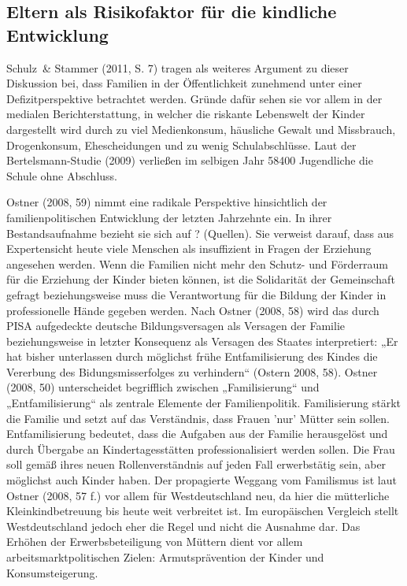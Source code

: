 \subsection{Eltern als Risikofaktor für die kindliche Entwicklung}\label{sec:Risikofaktoren}
Schulz~\& Stammer (2011, S. 7) tragen als weiteres Argument zu dieser Diskussion bei, dass Familien in der Öffentlichkeit zunehmend unter einer Defizitperspektive betrachtet werden. Gründe dafür sehen sie vor allem in der medialen Berichterstattung, in welcher die riskante Lebenswelt der Kinder dargestellt wird durch zu viel Medienkonsum, häusliche Gewalt und Missbrauch, Drogenkonsum, Ehescheidungen und zu wenig Schulabschlüsse. Laut der Bertelsmann-Studie (2009) verließen im selbigen Jahr 58400 Jugendliche die Schule ohne Abschluss. 

Ostner (2008, 59) nimmt eine radikale Perspektive hinsichtlich der familienpolitischen Entwicklung der letzten Jahrzehnte ein. In ihrer Bestandsaufnahme bezieht sie sich auf ? (Quellen). Sie verweist darauf, dass aus Expertensicht heute viele Menschen als insuffizient in Fragen der Erziehung angesehen werden. Wenn die Familien nicht mehr den Schutz- und Förderraum für die Erziehung der Kinder bieten können, ist die Solidarität der Gemeinschaft gefragt beziehungsweise muss die Verantwortung für die Bildung der Kinder in professionelle Hände gegeben werden. Nach Ostner (2008, 58) wird das durch PISA aufgedeckte deutsche Bildungsversagen als Versagen der Familie beziehungsweise in letzter Konsequenz als Versagen des Staates interpretiert: „Er hat bisher unterlassen durch möglichst frühe Entfamilisierung des Kindes die Vererbung des Bidungsmisserfolges zu verhindern“ (Ostern 2008, 58). Ostner (2008, 50) unterscheidet begrifflich zwischen „Familisierung“ und „Entfamilisierung“ als zentrale Elemente der Familienpolitik. Familisierung stärkt die Familie und setzt auf das Verständnis, dass Frauen 'nur' Mütter sein sollen. Entfamilisierung bedeutet, dass die Aufgaben aus der Familie herausgelöst und durch Übergabe an Kindertagesstätten professionalisiert werden sollen. Die Frau soll gemäß ihres neuen Rollenverständnis auf jeden Fall erwerbstätig sein, aber möglichst auch Kinder haben. Der propagierte Weggang vom Familismus ist laut Ostner (2008, 57 f.) vor allem für Westdeutschland neu, da hier die mütterliche Kleinkindbetreuung bis heute weit verbreitet ist. Im europäischen Vergleich stellt Westdeutschland jedoch eher die Regel und nicht die Ausnahme dar. Das Erhöhen der Erwerbsbeteiligung von Müttern dient vor allem arbeitsmarktpolitischen Zielen: Armutsprävention der Kinder und  Konsumsteigerung. 

